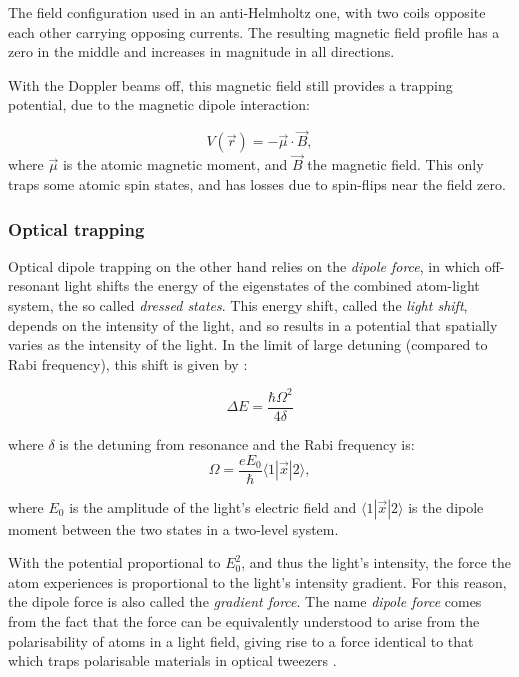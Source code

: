 The field configuration used in an anti-Helmholtz one, with two coils opposite each other carrying opposing currents. The resulting magnetic field profile has a zero in the middle and increases in magnitude in all directions.

With the Doppler beams off, this magnetic field still provides a trapping potential, due to the magnetic dipole interaction:

\begin{equation}
V(\vec{r}) = -\vec \mu \cdot \vec B,
\end{equation}
where $\vec\mu$ is the atomic magnetic moment, and $\vec B$ the magnetic field. This only traps some atomic spin states, and has losses due to spin-flips \cite{brink_majorana_2006} near the field zero.

\subsubsection{Optical trapping}

Optical dipole trapping on the other hand relies on the \emph{dipole force}, in which off-resonant light shifts the energy of the eigenstates of the combined atom-light system, the so called \emph{dressed states}. This energy shift, called the \emph{light shift}, depends on the intensity of the light, and so results in a potential that spatially varies as the intensity of the light. In the limit of large detuning (compared to Rabi frequency), this shift is given by \cite[p 8]{metcalf_laser_1999}:

\begin{equation}
\Delta E = \frac{\hbar\Omega^2}{4\delta}
\end{equation}

where $\delta$ is the detuning from resonance and the Rabi frequency is:
\begin{equation}
\Omega=\frac{eE_0}\hbar\langle1|\vec{x}|2\rangle,
\end{equation}

where $E_0$ is the amplitude of the light's electric field and  $\langle1|\vec{x}|2\rangle$ is the dipole moment between the two states in a two-level system.

With the potential proportional to $E_0^2$, and thus the light's intensity, the force the atom experiences is proportional to the light's intensity gradient. For this reason, the dipole force is also called the \emph{gradient force}. The name \emph{dipole force} comes from the fact that the force can be equivalently understood to arise from the polarisability of atoms in a light field, giving rise to a force identical to that which traps polarisable materials in optical tweezers \cite{ashkin_acceleration_1970}.


